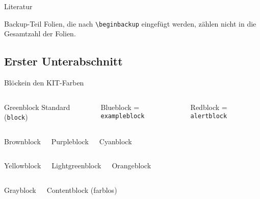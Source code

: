 \documentclass{sdqbeamer}
\begin{document}
\appendix
\beginbackup

\begin{frame}{Literatur}
\begin{exampleblock}{Backup-Teil}
    Folien, die nach \texttt{\textbackslash beginbackup} eingefügt werden, zählen nicht in die Gesamtzahl der Folien.
\end{exampleblock}

\printbibliography
\end{frame}


\subsection{Erster Unterabschnitt}
\begin{frame}{Blöcke}{in den KIT-Farben}
	\begin{columns}
		\begin{greenblock}{Greenblock}
			Standard (\texttt{block})
        \end{greenblock}
		\begin{blueblock}{Blueblock}
			= \texttt{exampleblock}
        \end{blueblock}
		\begin{redblock}{Redblock}
			= \texttt{alertblock}
        \end{redblock}
	\end{columns}
	\begin{columns}
		\column{.3\textwidth}
        \begin{brownblock}{Brownblock}
        \end{brownblock}
		\column{.3\textwidth}
        \begin{purpleblock}{Purpleblock}
        \end{purpleblock}
		\column{.3\textwidth}
        \begin{cyanblock}{Cyanblock}
        \end{cyanblock}
	\end{columns}
	\begin{columns}
        \begin{yellowblock}{Yellowblock}
        \end{yellowblock}
        \begin{lightgreenblock}{Lightgreenblock}
        \end{lightgreenblock}
        \begin{orangeblock}{Orangeblock}
        \end{orangeblock}
	\end{columns}
	\begin{columns}
		\column{.3\textwidth}
        \begin{grayblock}{Grayblock}
        \end{grayblock}
		\column{.3\textwidth}
		\begin{contentblock}{Contentblock}
			(farblos)
		\end{contentblock}
		\column{.3\textwidth}
	\end{columns}
\end{frame}
	  
\end{document}
